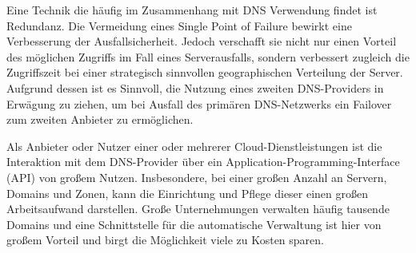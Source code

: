 Eine Technik die häufig im Zusammenhang mit DNS Verwendung findet ist Redundanz. Die Vermeidung eines Single Point of Failure bewirkt eine Verbesserung der Ausfallsicherheit. Jedoch verschafft sie nicht nur einen Vorteil des möglichen Zugriffs im Fall eines Serverausfalls, sondern verbessert zugleich die Zugriffszeit bei einer strategisch sinnvollen geographischen Verteilung der Server. Aufgrund dessen ist es Sinnvoll, die Nutzung eines zweiten DNS-Providers in Erwägung zu ziehen, um bei Ausfall des primären DNS-Netzwerks ein Failover zum zweiten Anbieter zu ermöglichen.\cite{Stratusly.2017}

Als Anbieter oder Nutzer einer oder mehrerer Cloud-Dienstleistungen ist die Interaktion mit dem DNS-Provider über ein Application-Programming-Interface (API) von großem Nutzen. Insbesondere, bei einer großen Anzahl an Servern, Domains und Zonen, kann die Einrichtung und Pflege dieser einen großen Arbeitsaufwand darstellen. Große Unternehmungen verwalten häufig tausende Domains und eine Schnittstelle für die automatische Verwaltung ist hier von großem Vorteil und birgt die Möglichkeit viele zu Kosten sparen.
